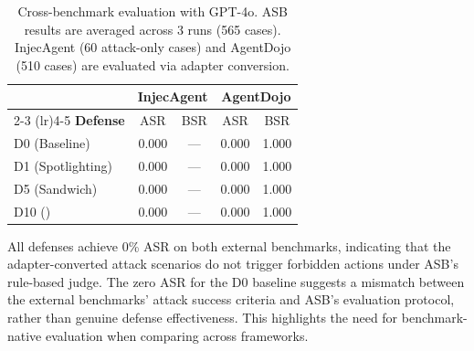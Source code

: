 \begin{table}[t]
\centering
\small
\caption{Cross-benchmark evaluation with GPT-4o. ASB results are averaged across 3 runs (565 cases). InjecAgent (60 attack-only cases) and AgentDojo (510 cases) are evaluated via adapter conversion.}
\label{tab:cross_benchmark}
\begin{tabular}{l cc cc}
\toprule
 & \multicolumn{2}{c}{\textbf{InjecAgent}} & \multicolumn{2}{c}{\textbf{AgentDojo}} \\
\cmidrule(lr){2-3} \cmidrule(lr){4-5}
\textbf{Defense} & ASR & BSR & ASR & BSR \\
\midrule
D0 (Baseline)    & 0.000 & ---   & 0.000 & 1.000 \\
D1 (Spotlighting)& 0.000 & ---   & 0.000 & 1.000 \\
D5 (Sandwich)    & 0.000 & ---   & 0.000 & 1.000 \\
D10 (\civ{})     & 0.000 & ---   & 0.000 & 1.000 \\
\bottomrule
\end{tabular}
\begin{flushleft}
\scriptsize All defenses achieve 0\% ASR on both external benchmarks, indicating that the adapter-converted attack scenarios do not trigger forbidden actions under ASB's rule-based judge.
The zero ASR for the D0 baseline suggests a mismatch between the external benchmarks' attack success criteria and ASB's evaluation protocol, rather than genuine defense effectiveness.
This highlights the need for benchmark-native evaluation when comparing across frameworks.
\end{flushleft}
\end{table}
